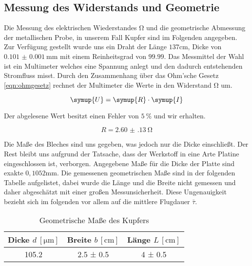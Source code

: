 \subsection{Messung des Widerstands und Geometrie}
\label{sec:aufgabe_a}
Die Messung des elektrischen Wiederstandes $\si{\ohm}$ und die geometrische Abmessung der metallischen Probe, in unserem Fall Kupfer sind im Folgenden angegeben.
Zur Verfügung gestellt wurde uns ein Draht der Länge $137\si{\cm}$, Dicke von $\SI{0.101(1)}{\milli\meter}$ mit einem Reinheitsgrad von $99.99$. 
Das Messmittel der Wahl ist ein Multimeter welches eine Spannung anlegt und den dadurch entstehenden Stromfluss misst.
Durch den Zusammenhang über das Ohm'sche Gesetz \eqref{eqn:ohmgesetz} rechnet der Multimeter die Werte in den Widerstand $\si{\ohm}$ um.

\begin{equation}
   \symup{U} = \symup{R} \cdot \symup{I}
\end{equation}

Der abgelesene Wert besitzt einen Fehler von $\SI{5}{\percent}$ und wir erhalten.

\begin{equation}
\label{eqn:ohmgesetz}
R = \SI{2.60(13)}{\ohm}
\end{equation}

Die Maße des Bleches sind uns gegeben, was jedoch nur die Dicke einschließt. %
Der Rest bleibt uns aufgrund der Tatsache, dass der Werkstoff in eine Arte Platine eingeschlossen ist, verborgen.
Angegebene Maße für die Dicke der Platte sind exakte $0,1052\si{\mm}$.
Die gemessenen geometrischen Maße sind in der folgenden Tabelle aufgelistet, dabei wurde die Länge und die Breite
nicht gemessen und daher abgeschätzt mit einer großen Messunsicherheit. 
Diese Ungenauigkeit bezieht sich im folgenden vor allem auf die mittlere Flugdauer $\bar{\tau}$.

\begin{table}
  \centering
  \caption{Geometrische Maße des Kupfers}
  \label{tab:kupfergeo}
  \begin{tabular}{c c c}
    Dicke {$d \: [\si{\micro\meter}]$} & Breite $b \, [\si{\centi\meter}]$ & Länge $L \, [\si{\centi\meter}]$ \\
    \midrule
    105.2   & 2.5 ± 0.5 & 4 ± 0.5 \\
    \bottomrule
  \end{tabular}
\end{table}
